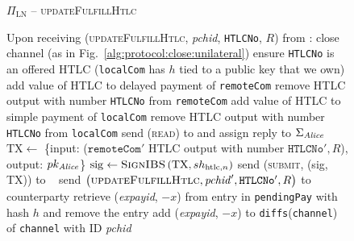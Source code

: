  \begin{figure}[H]
    \begin{protocolbox}{$\Pi_{\mathrm{LN}}$ -- \textsc{updateFulfillHtlc}}
      \begin{algorithmic}[1]
        \State Upon receiving (\textsc{updateFulfillHtlc}, \textit{pchid},
        \texttt{HTLCNo}, $R$) from \bob:
        \Indent
            \State close channel (as in
            Fig.~\ref{alg:protocol:close:unilateral})
            \State \Return
          \EndIf
          \State ensure \texttt{HTLCNo} is an offered HTLC (\texttt{localCom}
          has $h$ tied to a public key that we own)
          \State add value of HTLC to delayed payment of \texttt{remoteCom}
          \State remove HTLC output with number \texttt{HTLCNo} from
          \texttt{remoteCom}
          \State add value of HTLC to simple payment of \texttt{localCom}
          \State remove HTLC output with number \texttt{HTLCNo} from
          \texttt{localCom}
           
            \State send (\textsc{read}) to \ledger{} and assign reply to
            $\Sigma_{\mathit{Alice}}$
              \State $\mathrm{TX} \gets$ \{input: ($\mathtt{remoteCom}'$ HTLC
              output with number $\mathtt{HTLCNo}', R$), output:
              $pk_{\mathit{Alice}}$\}
              \State $\mathrm{sig} \gets \textsc{SignIBS}\left(\mathrm{TX},
              sh_{\mathrm{htlc}, n}\right)$
              \State send (\textsc{submit}, (sig, TX)) to \ledger{}
              \label{alg:protocol:pay:updateFulfillHtlc:submit}
            \Else \ 
              \State {}
              \State send $\left(\textsc{updateFulfillHtlc}, \mathit{pchid}',
              \mathtt{HTLCNo}', R\right)$ to counterparty
            \EndIf
          \Else {}
            \State retrieve (\textit{expayid}, $-x$) from entry in
            \texttt{pendingPay} with hash $h$ and remove the entry
            \State add (\textit{expayid}, $-x$) to
            \texttt{diffs}(\texttt{channel}) of \texttt{channel} with ID
            \textit{pchid}
          \EndIf
        \EndIndent
      \end{algorithmic}
    \end{protocolbox}
    \caption{}
    \label{alg:protocol:pay:updateFulfillHtlc}
  \end{figure}

